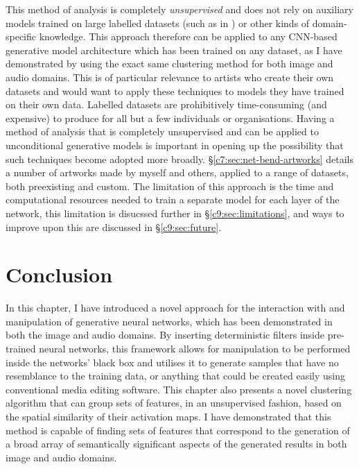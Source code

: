 This method of analysis is completely \emph{unsupervised} and does not rely on auxiliary models trained on large labelled datasets (such as in \citep{Bau2018-td, isola2017image, park2019semantic}) or other kinds of domain-specific knowledge. 
This approach therefore can be applied to any CNN-based generative model architecture which has been trained on any dataset, as I have demonstrated by using the exact same clustering method for both image and audio domains. 
This is of particular relevance to artists who create their own datasets and would want to apply these techniques to models they have trained on their own data. 
Labelled datasets are prohibitively time-consuming (and expensive) to produce for all but a few individuals or organisations. 
Having a method of analysis that is completely unsupervised and can be applied to unconditional generative models is important in opening up the possibility that such techniques become adopted more broadly.
\S \ref{c7:sec:net-bend-artworks} details a number of artworks made by myself and others, applied to a range of datasets, both preexisting and custom.
The limitation of this approach is the time and computational resources needed to train a separate model for each layer of the network, this limitation is disucssed further in \S \ref{c9:sec:limitations}, and ways to improve upon this are discussed in \S \ref{c9:sec:future}.


\section{Conclusion}

In this chapter, I have introduced a novel approach for the interaction with and manipulation of generative neural networks, which has been demonstrated in both the image and audio domains. 
By inserting deterministic filters inside pre-trained neural networks, this framework allows for manipulation to be performed inside the networks' black box and utilises it to generate samples that have no resemblance to the training data, or anything that could be created easily using conventional media editing software. 
This chapter also presents a novel clustering algorithm that can group sets of features, in an unsupervised fashion, based on the spatial similarity of their activation maps. 
I have demonstrated that this method is capable of finding sets of features that correspond to the generation of a broad array of semantically significant aspects of the generated results in both image and audio domains. 

